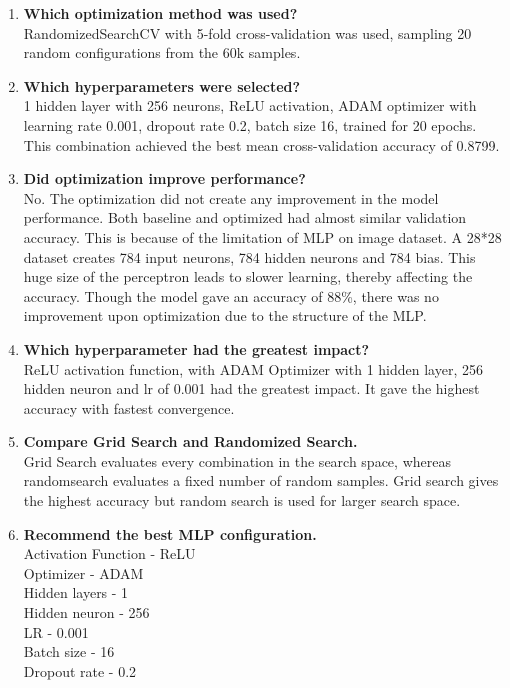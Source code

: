 \documentclass[11pt]{article}
\begin{document}
\begin{enumerate}
\item \textbf{Which optimization method was used?} \\
RandomizedSearchCV with 5-fold cross-validation was used, sampling 20 random configurations from the 60k samples.\\

\item \textbf{Which hyperparameters were selected?}\\
1 hidden layer with 256 neurons, ReLU activation, ADAM optimizer with learning rate 0.001, dropout rate 0.2, batch size 16, trained for 20 epochs. This combination achieved the best mean cross-validation accuracy of 0.8799.\\

\item \textbf{Did optimization improve performance?}\\
No. The optimization did not create any improvement in the model performance. Both baseline and optimized had almost similar validation accuracy. This is because of the limitation of MLP on image dataset. A 28*28 dataset creates 784 input neurons, 784 hidden neurons and 784 bias. This huge size of the perceptron leads to slower learning, thereby affecting the accuracy. Though the model gave an accuracy of 88\%, there was no improvement upon optimization due to the structure of the MLP.\\

\item \textbf{Which hyperparameter had the greatest impact?}\\
ReLU activation function, with ADAM Optimizer with 1 hidden layer, 256 hidden neuron and lr of 0.001 had the greatest impact. It gave the highest accuracy with fastest convergence.\\ 

\item \textbf{Compare Grid Search and Randomized Search.} \\
Grid Search evaluates every combination in the search space, whereas randomsearch evaluates a fixed number of random samples. Grid search gives the highest accuracy but random search is used for larger search space.\\

\item \textbf{Recommend the best MLP configuration.}\\
Activation Function - ReLU\\
Optimizer - ADAM\\
Hidden layers - 1\\
Hidden neuron - 256\\
LR - 0.001\\
Batch size - 16\\
Dropout rate - 0.2\\
\end{enumerate}
\end{document}
